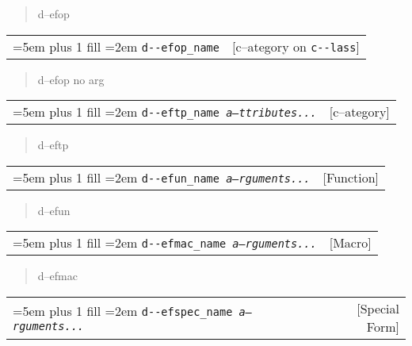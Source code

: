 \documentclass{book}
\begin{document}
\begin{titlepage}
%
\begin{quote}
\unskip{\parskip=0pt\noindent}%
d--efop
\end{quote}


\noindent\begin{tabularx}{\linewidth}{@{}Xr}
\rightskip=5em plus 1 fill
\hangindent=2em
\texttt{d{-}{-}efop\_name}& [c--ategory on \texttt{c{-}{-}lass}]
\end{tabularx}

%
\begin{quote}
\unskip{\parskip=0pt\noindent}%
d--efop no arg
\end{quote}


\noindent\begin{tabularx}{\linewidth}{@{}Xr}
\rightskip=5em plus 1 fill
\hangindent=2em
\texttt{d{-}{-}eftp\_name \EmbracOn{}\textnormal{\textsl{a--ttributes...}}\EmbracOff{}}& [c--ategory]
\end{tabularx}

%
\begin{quote}
\unskip{\parskip=0pt\noindent}%
d--eftp
\end{quote}


\noindent\begin{tabularx}{\linewidth}{@{}Xr}
\rightskip=5em plus 1 fill
\hangindent=2em
\texttt{d{-}{-}efun\_name \EmbracOn{}\textnormal{\textsl{a--rguments...}}\EmbracOff{}}& [Function]
\end{tabularx}

%
\begin{quote}
\unskip{\parskip=0pt\noindent}%
d--efun
\end{quote}


\noindent\begin{tabularx}{\linewidth}{@{}Xr}
\rightskip=5em plus 1 fill
\hangindent=2em
\texttt{d{-}{-}efmac\_name \EmbracOn{}\textnormal{\textsl{a--rguments...}}\EmbracOff{}}& [Macro]
\end{tabularx}

%
\begin{quote}
\unskip{\parskip=0pt\noindent}%
d--efmac
\end{quote}


\noindent\begin{tabularx}{\linewidth}{@{}Xr}
\rightskip=5em plus 1 fill
\hangindent=2em
\texttt{d{-}{-}efspec\_name \EmbracOn{}\textnormal{\textsl{a--rguments...}}\EmbracOff{}}& [Special Form]
\end{tabularx}


\end{titlepage}
\end{document}
